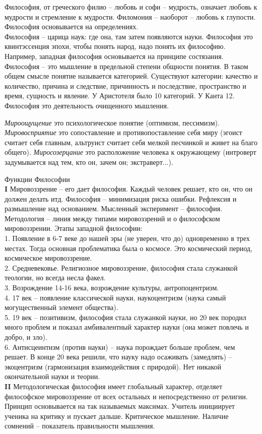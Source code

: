 \documentclass[a4paper, 12pt]{article}
\def\t{\hspace*{1cm}}
\begin{document}
Философия, от греческого филио -- любовь и софи -- мудрость, означает любовь к мудрости и стремление к мудрости. Филомония -- наоборот -- любовь к глупости. Философия основывается на определениях.
\\\t Философия -- царица наук: где она, там затем появляются науки. Философия это квинтэссенция эпохи, чтобы понять народ, надо понять их философию. Например, западная философия основывается на принципе состязания. 
\\\t Философия -- это мышление в предельной степени общности понятия. В таком общем смысле понятие называется категорией. Существуют категории: качество и количество, причина и следствие, причинность и последствие, пространство и время, сущность и явление. У Аристотеля было 10 категорий. У Канта 12.
\\\t Философия это деятельность очищенного мышления.

\textit{Мироощущение} это психологическое понятие (оптимизм, пессимизм). \textit{Мировосприятие} это сопоставление и противопоставление себя миру \linebreak(эгоист считает себя главным, альтруист считает себя мелкой песчинкой и живет на благо общего). \textit{Миросозерцание} это расположение человека к окружающему (интроверт задумывается над тем, кто он, зачем он; экстраверт...).

Функции Философии
\\\t \textbf{I} Мировоззрение -- его дает философия. Каждый человек решает, кто он, что он должен делать итд. Философия -- минимизация риска ошибки. Рефлексия и размышление над основанием. Мысленный эксперимент -- философия. 
Методология -- линия между типами мировоззрений и о философском мировоззрении.
Этапы западной философии:
\\\t 1. Появление в 6-7 веке до нашей эры (не уверен, что до) одновременно в трех местах. Тогда основная проблематика была о космосе. Это космический период, космическое мировоззрение. 
\\\t 2. Средневековье. Религиозное мировоззрение, философия стала служанкой теологии, но всегда несла факел. 
\\\t 3. Возрождение 14-16 века, возрождение культуры, антропоцентризм. 
\\\t 4. 17 век -- появление классической науки, наукоцентризм (наука самый могущественный элемент общества). 
\\\t 5. 19 век -- позитивизм, философия стала служанкой науки, но 20 век породил много проблем и показал амбивалентный характер науки (она может повлечь и добро, и зло).
\\\t 6. Антисцеинтизм (против науки) -- наука порождает больше проблем, чем решает. В конце 20 века решили, что науку надо осаживать (замедлять) -- экоцентризм (гармонизация взаимодействия с природой). Нет никакой окончательной науки и теории. 
\\\t \textbf{II} Методологическая философия имеет глобальный характер, отделяет философское мировоззрение от всех остальных и непосредственно от религии. Принцип основывается на так называемых максимах. Учитель инициирует ученика на критику и пускает дальше. Критическое мышление. Наличие сомнений -- показатель правильности мышления. 
\end{document}
